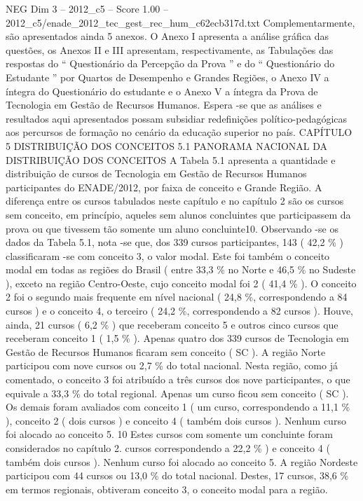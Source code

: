 \begin{textsample}{NEG Dim 3 – 2012\_c5 – Score 1.00 – 2012\_c5/enade\_2012\_tec\_gest\_rec\_hum\_c62ecb317d.txt}
Complementarmente, são apresentados ainda 5 anexos.
O Anexo I apresenta a análise gráfica das questões, os Anexos II e III apresentam, respectivamente, as Tabulações das respostas do “ Questionário da Percepção da Prova ” e do “ Questionário do Estudante ” por Quartos de Desempenho e Grandes Regiões, o Anexo IV a íntegra do Questionário do estudante e o Anexo V a íntegra da Prova de Tecnologia em Gestão de Recursos Humanos.
Espera -se que as análises e resultados aqui apresentados possam subsidiar redefinições político-pedagógicas aos percursos de formação no cenário da educação superior no país.
CAPÍTULO 5 DISTRIBUIÇÃO DOS CONCEITOS 5.1 PANORAMA NACIONAL DA DISTRIBUIÇÃO DOS CONCEITOS A Tabela 5.1 apresenta a quantidade e distribuição de cursos de Tecnologia em Gestão de Recursos Humanos participantes do ENADE/2012, por faixa de conceito e Grande Região.
A diferença entre os cursos tabulados neste capítulo e no capítulo 2 são os cursos sem conceito, em princípio, aqueles sem alunos concluintes que participassem da prova ou que tivessem tão somente um aluno concluinte10.
Observando -se os dados da Tabela 5.1, nota -se que, dos 339 cursos participantes, 143 ( 42,2 \% ) classificaram -se com conceito 3, o valor modal.
Este foi também o conceito modal em todas as regiões do Brasil ( entre 33,3 \% no Norte e 46,5 \% no Sudeste ), exceto na região Centro-Oeste, cujo conceito modal foi 2 ( 41,4 \% ).
O conceito 2 foi o segundo mais frequente em nível nacional ( 24,8 \%, correspondendo a 84 cursos ) e o conceito 4, o terceiro ( 24,2 \%, correspondendo a 82 cursos ).
Houve, ainda, 21 cursos ( 6,2 \% ) que receberam conceito 5 e outros cinco cursos que receberam conceito 1 ( 1,5 \% ).
Apenas quatro dos 339 cursos de Tecnologia em Gestão de Recursos Humanos ficaram sem conceito ( SC ).
A região Norte participou com nove cursos ou 2,7 \% do total nacional.
Nesta região, como já comentado, o conceito 3 foi atribuído a três cursos dos nove participantes, o que equivale a 33,3 \% do total regional.
Apenas um curso ficou sem conceito ( SC ).
Os demais foram avaliados com conceito 1 ( um curso, correspondendo a 11,1 \% ), conceito 2 ( dois cursos ) e conceito 4 ( também dois cursos ).
Nenhum curso foi alocado ao conceito 5. 10 Estes cursos com somente um concluinte foram considerados no capítulo 2. cursos correspondendo a 22,2 \% ) e conceito 4 ( também dois cursos ).
Nenhum curso foi alocado ao conceito 5.
A região Nordeste participou com 44 cursos ou 13,0 \% do total nacional.
Destes, 17 cursos, 38,6 \% em termos regionais, obtiveram conceito 3, o conceito modal para a região.

\end{textsample}
